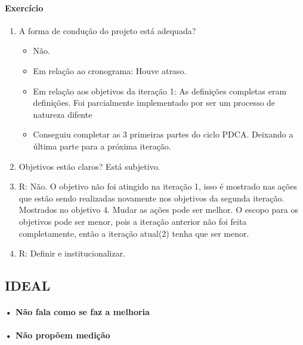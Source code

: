 \documentclass{article}
\begin{document}
	
	\paragraph{Exercício} 
	\begin{enumerate}
	\item A forma de condução do projeto está adequada?
		\begin{itemize}
		\item Não. 
		\item Em relação ao cronograma: Houve atraso.
		\item Em relação aos objetivos da iteração 1: As definições completas eram definições. Foi parcialmente implementado por ser um processo de natureza difente
		\item Conseguiu completar as 3 primeiras partes do ciclo PDCA. Deixando a última parte para a próxima iteração.
		\end{itemize}			
	\item Objetivos estão claros?
		Está subjetivo.
	
	\item R: Não. O objetivo não foi atingido na iteração 1, isso é mostrado nas ações que estão sendo realizadas novamente nos objetivos da segunda iteração. Mostrados no objetivo 4. Mudar as ações pode ser melhor. O escopo para os objetivos pode ser menor, pois a iteração anterior não foi feita completamente, então a iteração atual(2) tenha que ser menor.
	
	\item R: Definir e institucionalizar.
	
	\end{enumerate}		


\subsection{IDEAL}
\paragraph{• Não fala como se faz a melhoria}
\paragraph{• Não propõem medição}
\end{document}
